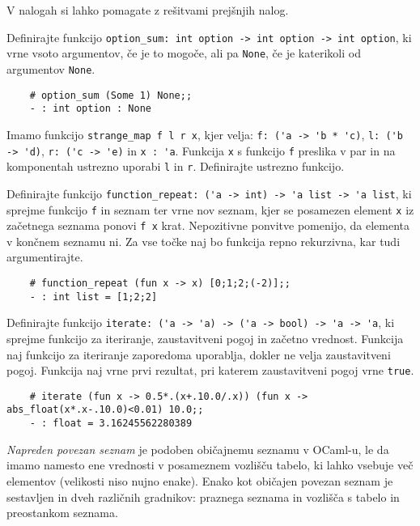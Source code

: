 \documentclass[arhiv]{../izpit}
\begin{document}
	
	
	
	V nalogah si lahko pomagate z rešitvami prejšnjih nalog.
	
	\naloga 
	
	\podnaloga Definirajte funkcijo \verb|option_sum: int option -> int option -> int option|, ki vrne vsoto argumentov, če je to mogoče, ali pa \verb|None|, če je katerikoli od argumentov \verb|None|.
	\begin{verbatim}
	# option_sum (Some 1) None;;
	- : int option : None
	\end{verbatim}
	
	\podnaloga Imamo funkcijo \verb|strange_map f l r x|, kjer velja: \verb|f: ('a -> 'b * 'c)|, \verb|l: ('b -> 'd)|, \verb|r: ('c -> 'e)| in \verb|x : 'a|. Funkcija \verb|x| s funkcijo \verb|f| preslika v par in na komponentah ustrezno uporabi \verb|l| in \verb|r|. Definirajte ustrezno funkcijo.
	
	\podnaloga Definirajte funkcijo \verb|function_repeat: ('a -> int) -> 'a list -> 'a list|, ki sprejme funkcijo \verb|f| in seznam ter vrne nov seznam, kjer se posamezen element \verb|x| iz začetnega seznama ponovi \verb|f x| krat. Nepozitivne ponvitve pomenijo, da elementa v končnem seznamu ni. Za vse točke naj bo funkcija repno rekurzivna, kar tudi argumentirajte.
	\begin{verbatim}
	# function_repeat (fun x -> x) [0;1;2;(-2)];;
	- : int list = [1;2;2]
	\end{verbatim}
	
	
	\podnaloga Definirajte funkcijo \verb|iterate: ('a -> 'a) -> ('a -> bool) -> 'a -> 'a|, ki sprejme funkcijo za iteriranje, zaustavitveni pogoj in začetno vrednost. Funkcija naj funkcijo za iteriranje zaporedoma uporablja, dokler ne velja zaustavitveni pogoj. Funkcija naj vrne prvi rezultat, pri katerem zaustavitveni pogoj vrne \verb|true|.
	
	\begin{verbatim}
	# iterate (fun x -> 0.5*.(x+.10.0/.x)) (fun x -> abs_float(x*.x-.10.0)<0.01) 10.0;;
	- : float = 3.16245562280389
	\end{verbatim}
	
	\naloga
	\textit{Napreden povezan seznam} je podoben običajnemu seznamu v OCaml-u, le da imamo namesto ene vrednosti v posameznem vozlišču tabelo, ki lahko vsebuje več elementov (velikosti niso nujno enake). Enako kot običajen povezan seznam je sestavljen in dveh različnih gradnikov: praznega seznama in vozlišča s tabelo in preostankom seznama.
	
\end{document}
